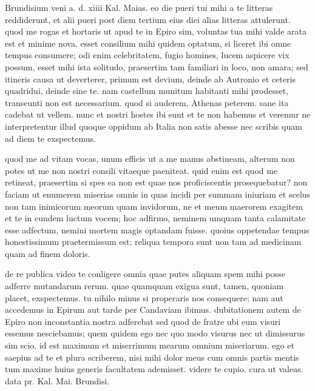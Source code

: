 


 Brundisium veni a. d. xiiii Kal. Maias. eo die pueri tui mihi a te litteras reddiderunt, et alii pueri post diem tertium eius diei alias litteras attulerunt. quod me rogas et hortaris ut apud te in Epiro sim, voluntas tua mihi valde arata est et minime nova. esset consilium mihi quidem optatum, si liceret ibi omne tempus consumere; odi enim celebritatem, fugio homines, lucem aspicere vix possum, esset mihi ista solitudo, praesertim tam familiari in loco, non amara; sed itineris causa ut deverterer, primum est devium, deinde ab Autronio et ceteris quadridui, deinde sine te. nam castellum munitum habitanti mihi prodesset, transeunti non est necessarium. quod si auderem, Athenas peterem. sane ita cadebat ut vellem. nunc et nostri hostes ibi sunt et te non habemus et veremur ne interpretentur illud quoque oppidum ab Italia non satis abesse nec scribis quam ad diem te exspectemus.

 quod me ad vitam vocas, unum efficis ut a me manus abstineam, alterum non potes ut me non nostri consili vitaeque paeniteat. quid enim est quod me retineat, praesertim si spes ea non est quae nos proficiscentis prosequebatur? non faciam ut enumerem miserias omnis in quas incidi per summam iniuriam et scelus non tam inimicorum meorum quam invidorum, ne et meum maerorem exagitem et te in eundem luctum vocem; hoc adfirmo, neminem umquam tanta calamitate esse adfectum, nemini mortem magis optandam fuisse. quoius oppetendae tempus honestissimum praetermissum est; reliqua tempora sunt non tam ad medicinam quam ad finem doloris.

 de re publica video te conligere omnia quae putes aliquam spem mihi posse adferre mutandarum rerum. quae quamquam exigua sunt, tamen, quoniam placet, exspectemus. tu nihilo minus si properaris nos consequere; nam aut accedemus in Epirum aut tarde per Candaviam ibimus. dubitationem autem de Epiro non inconstantia nostra adferebat sed quod de fratre ubi eum visuri essemus nesciebamus; quem quidem ego nec quo modo visurus nec ut dimissurus sim scio. id est maximum et miserrimum mearum omnium miseriarum. ego et saepius ad te et plura scriberem, nisi mihi dolor meus cum omnis partis mentis tum maxime huius generis facultatem ademisset. videre te cupio. cura ut valeas. data pr. Kal. Mai. Brundisi.

